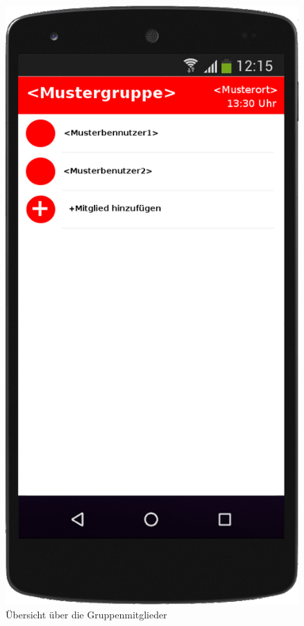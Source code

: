 \begin{figure}
	\caption{Übersicht über die Gruppenmitglieder}
	\includegraphics[scale =0.2]{resources/images/handy/gruppendetails_admin.png}
\end{figure}

